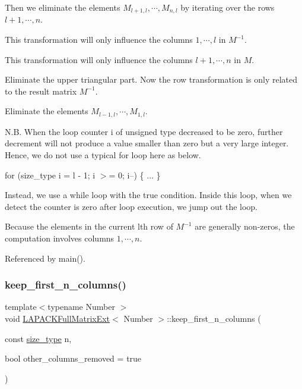Then we eliminate the elements $M_{l+1,l}, \cdots, M_{n,l}$ by iterating over the rows $l + 1, \cdots, n$.

This transformation will only influence the columns $1, \cdots, l$ in $M^{-1}$.

This transformation will only influence the columns $l+1, \cdots, n$ in $M$.

Eliminate the upper triangular part. Now the row transformation is only related to the result matrix $M^{-1}$.

Eliminate the elements $M_{l-1,l}, \cdots, M_{1,l}$.

N.\+B. When the loop counter {\ttfamily i} of {\ttfamily unsigned} type decreased to be zero, further decrement will not produce a value smaller than zero but a very large integer. Hence, we do not use a typical {\ttfamily for} loop here as below.

{\ttfamily  for (size\+\_\+type i = l -\/ 1; i $>$= 0; i--) \{ ... \} }

Instead, we use a {\ttfamily while} loop with the {\ttfamily true} condition. Inside this loop, when we detect the counter is zero after loop execution, we jump out the loop.

Because the elements in the current l\textquotesingle{}th row of $M^{-1}$ are generally non-\/zeros, the computation involves columns $1, \cdots, n$.

Referenced by main().

\mbox{\label{classLAPACKFullMatrixExt_a9c94fd182607dca5b2aa56bca4eb0523}} 
\subsubsection{\texorpdfstring{keep\+\_\+first\+\_\+n\+\_\+columns()}{keep\_first\_n\_columns()}}
{\footnotesize\ttfamily template$<$typename Number $>$ \\
void \hyperlink{classLAPACKFullMatrixExt}{L\+A\+P\+A\+C\+K\+Full\+Matrix\+Ext}$<$ Number $>$\+::keep\+\_\+first\+\_\+n\+\_\+columns (\begin{DoxyParamCaption}\item[{const \hyperlink{classLAPACKFullMatrixExt_a5cf5f4a6104dc17029210b5ca52bf574}{size\+\_\+type}}]{n,  }\item[{bool}]{other\+\_\+columns\+\_\+removed = {\ttfamily true} }\end{DoxyParamCaption})}

